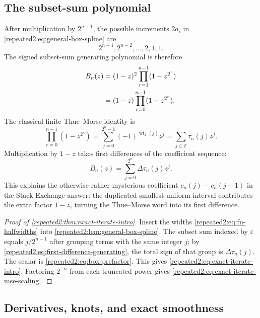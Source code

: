 \documentclass[11pt,oneside]{article}
\theoremstyle{definition}
\theoremstyle{remark}
\newcommand{\wt}{\operatorname{wt}_2}
\begin{document}
\subsection{The subset-sum polynomial}

After multiplication by $2^{n-1}$, the possible increments $2a_i$ in
\eqref{repeated2:eq:general-box-spline} are
\begin{equation}
 2^{n-1},2^{n-2},\ldots,2,1,1.
 \label{repeated2:eq:integer-increments}
\end{equation}
The signed subset-sum generating polynomial is therefore
\begin{align}
 B_n(z)
 &=(1-z)^2\prod_{r=1}^{n-1}(1-z^{2^r}) \notag\\
 &=(1-z)\prod_{r=0}^{n-1}(1-z^{2^r}).
 \label{repeated2:eq:subset-polynomial}
\end{align}
The classical finite Thue--Morse identity is
\begin{equation}
 \prod_{r=0}^{n-1}(1-z^{2^r})
 =\sum_{j=0}^{2^n-1}(-1)^{\wt(j)}z^j
 =\sum_{j\in\mathbb Z}\tau_n(j)z^j.
 \label{repeated2:eq:thue-morse-product}
\end{equation}
Multiplication by $1-z$ takes first differences of the coefficient sequence:
\begin{equation}
 B_n(z)=\sum_{j=0}^{2^n}\Delta\tau_n(j)z^j.
 \label{repeated2:eq:first-difference-generating}
\end{equation}
This explains the otherwise rather mysterious coefficient
$c_n(j)-c_n(j-1)$ in the Stack Exchange answer: the duplicated smallest uniform interval
contributes the extra factor $1-z$, turning the Thue--Morse word into its first difference.

\begin{proof}[Proof of \cref{repeated2:thm:exact-iterate-intro}]
Insert the widths \eqref{repeated2:eq:fn-halfwidths} into \cref{repeated2:lem:general-box-spline}.  The
subset sum indexed by $\varepsilon$ equals $j/2^{n-1}$ after grouping terms with the same
integer $j$; by \eqref{repeated2:eq:first-difference-generating}, the total sign of that group is
$\Delta\tau_n(j)$.  The scalar is \eqref{repeated2:eq:box-prefactor}.  This gives
\eqref{repeated2:eq:exact-iterate-intro}.  Factoring $2^{-n}$ from each truncated power gives
\eqref{repeated2:eq:exact-iterate-mse-scaling}.
\end{proof}

\subsection{Derivatives, knots, and exact smoothness}
\end{document}
